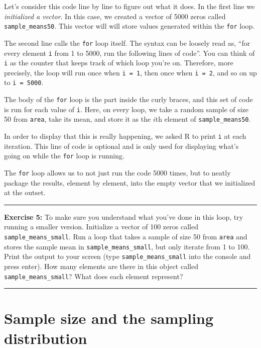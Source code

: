 \documentclass[]{book}
\theoremstyle{definition}
\theoremstyle{definition}
\theoremstyle{definition}
\theoremstyle{remark}
\begin{document}
Let's consider this code line by line to figure out what it does. In the
first line we \emph{initialized a vector}. In this case, we created a
vector of 5000 zeros called \texttt{sample\_means50}. This vector will
will store values generated within the \texttt{for} loop.

The second line calls the \texttt{for} loop itself. The syntax can be
loosely read as, ``for every element \texttt{i} from 1 to 5000, run the
following lines of code''. You can think of \texttt{i} as the counter
that keeps track of which loop you're on. Therefore, more precisely, the
loop will run once when \texttt{i\ =\ 1}, then once when
\texttt{i\ =\ 2}, and so on up to \texttt{i\ =\ 5000}.

The body of the \texttt{for} loop is the part inside the curly braces,
and this set of code is run for each value of \texttt{i}. Here, on every
loop, we take a random sample of size 50 from \texttt{area}, take its
mean, and store it as the \(i\)th element of \texttt{sample\_means50}.

In order to display that this is really happening, we asked R to print
\texttt{i} at each iteration. This line of code is optional and is only
used for displaying what's going on while the \texttt{for} loop is
running.

The \texttt{for} loop allows us to not just run the code 5000 times, but
to neatly package the results, element by element, into the empty vector
that we initialized at the outset.

\begin{center}\rule{0.5\linewidth}{\linethickness}\end{center}

\textbf{Exercise 5:} To make sure you understand what you've done in
this loop, try running a smaller version. Initialize a vector of 100
zeros called \texttt{sample\_means\_small}. Run a loop that takes a
sample of size 50 from \texttt{area} and stores the sample mean in
\texttt{sample\_means\_small}, but only iterate from 1 to 100. Print the
output to your screen (type \texttt{sample\_means\_small} into the
console and press enter). How many elements are there in this object
called \texttt{sample\_means\_small}? What does each element represent?

\begin{center}\rule{0.5\linewidth}{\linethickness}\end{center}

\hypertarget{sample-size-and-the-sampling-distribution}{%
\section{Sample size and the sampling
distribution}\label{sample-size-and-the-sampling-distribution}}
\end{document}
